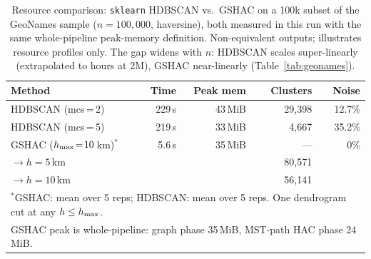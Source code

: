\begin{table}[!h]
\caption{Resource comparison: \texttt{sklearn} HDBSCAN vs.\ GSHAC on a 100k
  subset of the GeoNames sample (\(n = 100{,}000\), haversine), both measured
  in this run with the same whole-pipeline peak-memory definition.
  Non-equivalent outputs; illustrates resource profiles only. The gap widens with
  \(n\): HDBSCAN scales super-linearly (extrapolated to hours at 2M), GSHAC
  near-linearly (Table~\ref{tab:geonames}).}
\label{tab:hdbscan}
\small
\begin{tabular}{lrrrr}
\toprule
\textbf{Method} & \textbf{Time} & \textbf{Peak mem} & \textbf{Clusters} & \textbf{Noise} \\
\midrule
HDBSCAN (mcs\,=\,2) & 229\,s & 43\,MiB & 29{,}398 & 12.7\% \\
HDBSCAN (mcs\,=\,5) & 219\,s & 33\,MiB & 4{,}667 & 35.2\% \\
\addlinespace
GSHAC (\(h_{\max}\!=\!10\)\,km)\(^{*}\) & 5.6\,s & 35\,MiB & --- & 0\% \\
\quad\(\to h\!=\!5\)\,km  & & & 80{,}571 & \\
\quad\(\to h\!=\!10\)\,km & & & 56{,}141 & \\
\bottomrule
\multicolumn{5}{l}{\footnotesize \(^{*}\)GSHAC: mean over 5 reps; HDBSCAN: mean over 5 reps. One dendrogram cut at any \(h \leq h_{\max}\).} \\
\multicolumn{5}{l}{\footnotesize GSHAC peak is whole-pipeline: graph phase 35\,MiB, MST-path HAC phase 24\,MiB.}
\end{tabular}
\end{table}